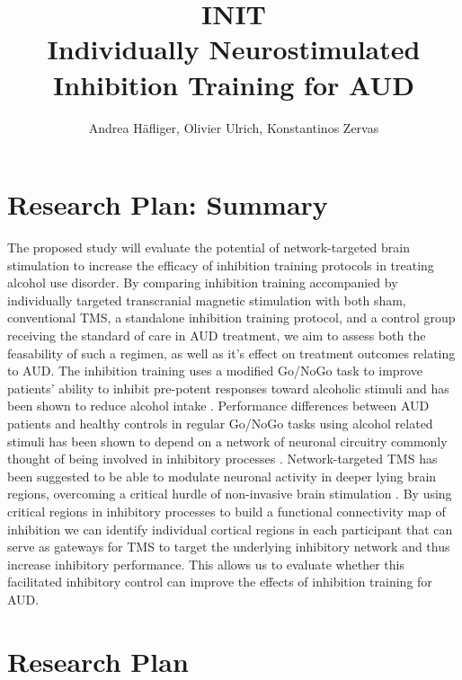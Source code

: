 \documentclass[12pt]{article}
\title{%
	INIT \\
	\large Individually Neurostimulated Inhibition Training for AUD}
\author{Andrea Häfliger, Olivier Ulrich, Konstantinos Zervas}
\begin{document}
\pagestyle{fancy}
\thispagestyle{empty}

\maketitle
\newpage
\tableofcontents
\newpage

\section{Research Plan: Summary}

The proposed study will evaluate the potential of network-targeted brain stimulation to increase the efficacy of inhibition training protocols in treating alcohol use disorder. By comparing inhibition training accompanied by individually targeted transcranial magnetic stimulation with both sham, conventional TMS, a standalone inhibition training protocol, and a control group receiving the standard of care in AUD treatment, we aim to assess both the feasability of such a regimen, as well as it's effect on treatment outcomes relating to AUD. The inhibition training uses a modified Go/NoGo task to improve patients' ability to inhibit pre-potent responses toward alcoholic stimuli and has been shown to reduce alcohol intake \parencite{houbenBeerNogoLearning2012}. Performance differences between AUD patients and healthy controls in regular Go/NoGo tasks using alcohol related stimuli has been shown to depend on a network of neuronal circuitry commonly thought of being involved in inhibitory processes \parencite{czaplaAlcoholdependentPatientsShow2017,volkowAddictionScienceUncovering2014,simmondsMetaanalysisGoNogo2008,luijtenSystematicReviewERP2014}. Network-targeted TMS has been suggested to be able to modulate neuronal activity in deeper lying brain regions, overcoming a critical hurdle of non-invasive brain stimulation \parencite{momiCognitiveEnhancementNetworkTargeted2020}. By using critical regions in inhibitory processes to build a functional connectivity map of inhibition we can identify individual cortical regions in each participant that can serve as gateways for TMS to target the underlying inhibitory network and thus increase inhibitory performance. This allows us to evaluate whether this facilitated inhibitory control can improve the effects of inhibition training for AUD.

\section{Research Plan}
\end{document}
